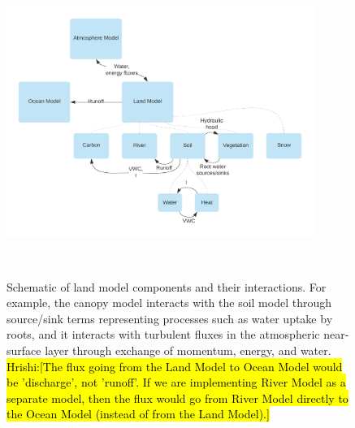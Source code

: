 \documentclass[twoside,10pt]{report}
\begin{document}
\begin{figure}[htb]
\includegraphics[width=10cm,height=10cm,keepaspectratio]{CLIMA-land/LM_figures/JPLCLIMA_LM_DESIGN_20200915.png}
\caption{Schematic of land model components and their interactions. For example, the canopy model interacts with the soil model through source/sink terms representing processes such as water uptake by roots, and it interacts with turbulent fluxes in the atmospheric near-surface layer through exchange of momentum, energy, and water. \hl{Hrishi:[The flux going from the Land Model to Ocean Model would be 'discharge', not 'runoff'. If we are implementing River Model as a separate model, then the flux would go from River Model directly to the Ocean Model (instead of from the Land Model).]}}
\label{f:land_model_schematic}
\end{figure}
\end{document}
